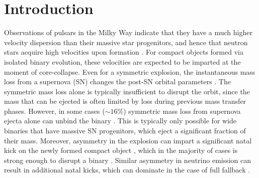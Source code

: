 \documentclass[apj,twocolumn]{openjournal}
\begin{document}
\maketitle
\section{Introduction}

Observations of pulsars in the Milky Way indicate that they have a much higher velocity dispersion than their massive star progenitors, and hence that neutron stars acquire high velocities upon formation \citep[e.g.,][]{Gunn+1970:1970ApJ...160..979G, Hobbs+2005:2005MNRAS.360..974H, Igoshev+2020}. For compact objects formed via isolated binary evolution, these velocities are expected to be imparted at the moment of core-collapse. Even for a symmetric explosion, the instantaneous mass loss from a supernova (SN) changes the post-SN orbital parameters \citep{Blaauw+1961, Boersma+1961}. The symmetric mass loss alone is typically insufficient to disrupt the orbit, since the mass that can be ejected is often limited by loss during previous mass transfer phases. However, in some cases (${\sim}16\%$) symmetric mass loss from supernova ejecta alone can unbind the binary \citep{Renzo+2019:2019A&A...624A..66R}. This is typically only possible for wide binaries that have massive SN progenitors, which eject a significant fraction of their mass. Moreover, asymmetry in the explosion can impart a significant natal kick on the newly formed compact object \citep[e.g.,][]{Shklovskii+1970:1970SvA....13..562S,Lyne+1994:1994Natur.369..127L,Janka+2013:2013MNRAS.434.1355J,Janka+2017:2017ApJ...837...84J, Burrows+2024:2024ApJ...963...63B}, which in the majority of cases is strong enough to disrupt a binary \citep[e.g.,][]{DeDonder+1997:1997A&A...318..812D,Eldridge+2011:2011MNRAS.414.3501E,Renzo+2019:2019A&A...624A..66R}. Similar asymmetry in neutrino emission can result in additional natal kicks, which can dominate in the case of full fallback \citep[e.g.,][]{Janka+1994:1994A&A...290..496J,Burrows+1996:1996PhRvL..76..352B,Scheck+2006:2006A&A...457..963S,Wongwathanarat+2013,Coleman+2022:2022MNRAS.517.3938C,Vigna-Gomez+2024:2024PhRvL.132s1403V}.
\end{document}
